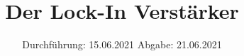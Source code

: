 

\subject{V303}
\title{Der Lock-In Verstärker}
\date{%
  Durchführung: 15.06.2021
  \hspace{3em}
  Abgabe: 21.06.2021
}



\maketitle
\thispagestyle{empty}
\tableofcontents
\newpage






\printbibliography{}


